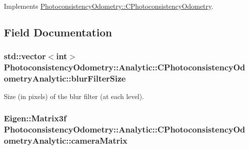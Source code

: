 Implements \hyperlink{class_photoconsistency_odometry_1_1_c_photoconsistency_odometry_a4f04b88ac54670b03b5c2bf773bca018}{PhotoconsistencyOdometry::CPhotoconsistencyOdometry}.



\subsection{Field Documentation}
\hypertarget{class_photoconsistency_odometry_1_1_analytic_1_1_c_photoconsistency_odometry_analytic_abc3f7da046ef73b3cd4b8a4ad5abf441}{
\subsubsection[{blurFilterSize}]{\setlength{\rightskip}{0pt plus 5cm}std::vector$<$int$>$ {\bf PhotoconsistencyOdometry::Analytic::CPhotoconsistencyOdometryAnalytic::blurFilterSize}}}
\label{class_photoconsistency_odometry_1_1_analytic_1_1_c_photoconsistency_odometry_analytic_abc3f7da046ef73b3cd4b8a4ad5abf441}
Size (in pixels) of the blur filter (at each level). \hypertarget{class_photoconsistency_odometry_1_1_analytic_1_1_c_photoconsistency_odometry_analytic_a6338098cb3cee04a59768a27b84e29e0}{
\subsubsection[{cameraMatrix}]{\setlength{\rightskip}{0pt plus 5cm}Eigen::Matrix3f {\bf PhotoconsistencyOdometry::Analytic::CPhotoconsistencyOdometryAnalytic::cameraMatrix}}}
\label{class_photoconsistency_odometry_1_1_analytic_1_1_c_photoconsistency_odometry_analytic_a6338098cb3cee04a59768a27b84e29e0}
